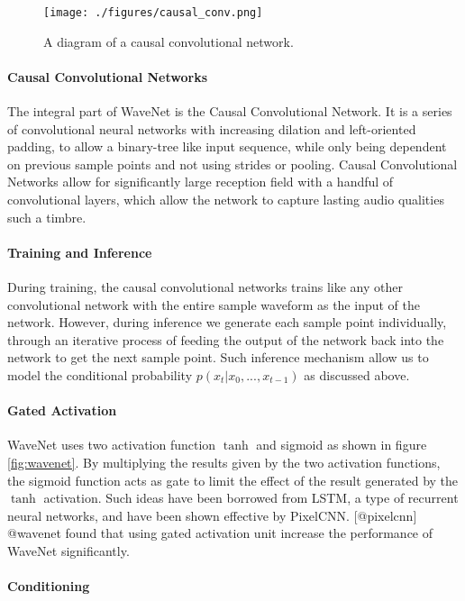 \documentclass[12pt,a4paper,]{report}
\begin{document}
\begin{figure}[h]
    \texttt{[image: ./figures/causal\_conv.png]}
    \centering
    \caption{A diagram of a causal convolutional network.} \label{fig:causal_conv}
\end{figure}

\paragraph{Causal Convolutional Networks}

The integral part of WaveNet is the Causal Convolutional Network. It is
a series of convolutional neural networks with increasing dilation and
left-oriented padding, to allow a binary-tree like input sequence, while
only being dependent on previous sample points and not using strides or
pooling. Causal Convolutional Networks allow for significantly large
reception field with a handful of convolutional layers, which allow the
network to capture lasting audio qualities such a timbre.

\paragraph{Training and Inference}

During training, the causal convolutional networks trains like any other
convolutional network with the entire sample waveform as the input of
the network. However, during inference we generate each sample point
individually, through an iterative process of feeding the output of the
network back into the network to get the next sample point. Such
inference mechanism allow us to model the conditional probability
\(p(x_t | x_0, ..., x_{t-1})\) as discussed above.

\paragraph{Gated Activation}

WaveNet uses two activation function \(\tanh\) and sigmoid as shown in
figure \ref{fig:wavenet}. By multiplying the results given by the two
activation functions, the sigmoid function acts as gate to limit the
effect of the result generated by the \(\tanh\) activation. Such ideas
have been borrowed from LSTM, a type of recurrent neural networks, and
have been shown effective by PixelCNN. {[}@pixelcnn{]} @wavenet found
that using gated activation unit increase the performance of WaveNet
significantly.

\paragraph{Conditioning}
\end{document}
